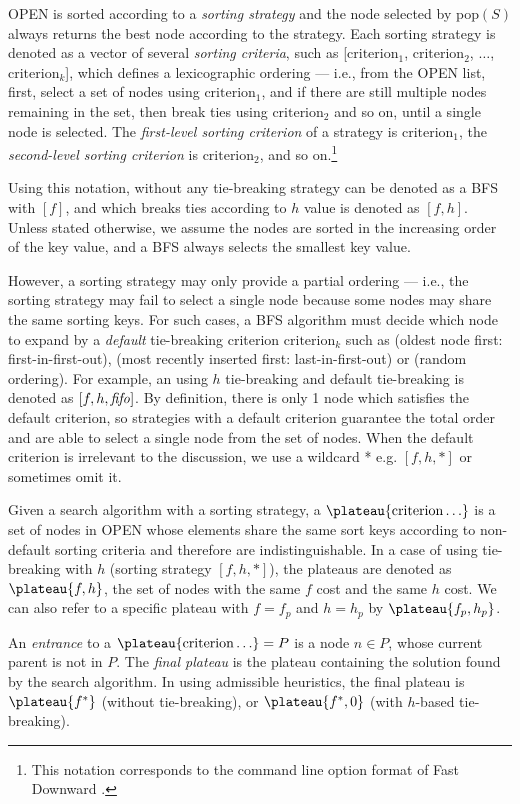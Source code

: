 OPEN is sorted according to a \emph{sorting strategy} and the node selected by pop$(S)$ always returns the best node according to the strategy.
Each sorting strategy is denoted as a vector of several \emph{sorting criteria}, such as
[$\text{criterion}_1$, $\text{criterion}_2$, $\ldots$,
$\text{criterion}_k$], which defines a lexicographic ordering ---
i.e., from the OPEN list, first, select a
set of nodes using $\text{criterion}_1$, and if there are still multiple
nodes remaining in the set, then break ties using $\text{criterion}_2$
and so on, until a single node is selected.  The \emph{first-level
sorting criterion} of a strategy is $\text{criterion}_1$, the
\emph{second-level sorting criterion} is $\text{criterion}_2$, and so on.\footnote{This notation corresponds to the command line option format of Fast
Downward \cite{Helmert2006}.} %


Using this notation, \astar without any tie-breaking strategy can be
denoted as a BFS with $[f]$, and \astar which breaks ties according to $h$
value is denoted as $[f,h]$.
Unless stated otherwise, we assume the nodes are sorted in the
increasing order of the key value, and a BFS always selects the smallest
key value.

However, a sorting strategy may only provide a partial ordering ---
i.e., the sorting strategy may fail to select a single node because some nodes
may share the same sorting keys.
For such cases, a BFS algorithm must
decide which node to expand by a \emph{default} tie-breaking
criterion $\text{criterion}_k$ such as  \fifo (oldest node first: first-in-first-out), \lifo
(most recently inserted first: last-in-first-out) or \ro (random ordering).
For example, an \astar using $h$ tie-breaking and \fifo default tie-breaking
 is denoted as $[f,h,{\text{\textit{fifo}}}]$.
By definition, there is only 1 node which satisfies the default criterion, so
strategies with a default criterion guarantee the total order and
are able to select a single node from the set of nodes.
When the default criterion is irrelevant to the discussion,
we use a wildcard * e.g. $[f,h,*]$ or sometimes omit it.

Given a search algorithm with a sorting strategy, 
a $\plateau{\text{criterion}\ldots}$ is a set of nodes in OPEN whose elements share
the same sort keys according to non-default sorting criteria and therefore
are indistinguishable. In a case of \astar
using tie-breaking with $h$ (sorting strategy $[f,h,*]$), the plateaus are denoted as
$\plateau{f,h}$, the set of nodes with the same $f$ cost and the same $h$ cost.
We can also refer to a specific plateau with $f=f_p$ and $h=h_p$ by $\plateau{f_p,h_p}$.

An \emph{entrance} to a $\plateau{\text{criterion}\ldots}=P$ is
a node $n \in P$, whose current parent is not in
$P$. The \emph{final plateau} is the plateau
containing the solution found by the search algorithm.  In \astar using
admissible heuristics, the final plateau is $\plateau{f^*}$ (without
tie-breaking), or $\plateau{f^*,0}$ (with $h$-based tie-breaking).
